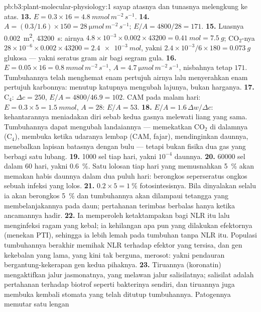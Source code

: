 \begin{solution}{pb:b3:plant-molecular-physiology:1}
sayap atasnya dan tunasnya melengkung ke atas.
\textbf{13.} $E = 0.3\times 16 = \qty{4.8}{mmol\,m^{-2}\,s^{-1}}$.
\textbf{14.} $A = (0.3/1.6)\times 150 = \qty{28}{\micro mol\,m^{-2}\,s^{-1}}$;
$E/A = 4800/28 = 171$.
\textbf{15.} Luasnya \qty{0.002}{m^2}, \num{43200}~s: airnya $4.8\times
10^{-3}\times 0.002\times\num{43200} = \qty{0.41}{mol} = \qty{7.5}{g}$;
CO$_{2}$-nya $28\times 10^{-6}\times 0.002\times\num{43200} =
\qty{2.4e-3}{mol}$, yakni $2.4\times 10^{-3}/6\times 180 =
\qty{0.073}{g}$ glukosa --- yakni seratus gram air bagi segram
gula.
\textbf{16.} $E = 0.05\times 16 = \qty{0.8}{mmol\,m^{-2}\,s^{-1}}$,
$A = \qty{4.7}{\micro mol\,m^{-2}\,s^{-1}}$, nisbahnya tetap $171$. Tumbuhannya
telah menghemat enam pertujuh airnya lalu menyerahkan enam pertujuh
karbonnya: menutup katupnya mengubah lajunya, bukan harganya.
\textbf{17.} C$_{4}$: $\Delta c = 250$, $E/A = 4800/46.9 = 102$. CAM pada
malam hari: $E = 0.3\times 5 = \qty{1.5}{mmol}$, $A = 28$: $E/A = 53$.
\textbf{18.} $E/A = 1.6\,\Delta w/\Delta c$: kehantarannya meniadakan diri
sebab kedua gasnya melewati liang yang sama. Tumbuhannya dapat mengubah
landaiannya --- memekatkan CO$_{2}$ di dalamnya (C$_{4}$), membuka ketika udaranya
lembap (CAM, fajar), mendinginkan daunnya, menebalkan lapisan batasnya dengan bulu
--- tetapi bukan fisika dua gas yang berbagi satu lubang.
\textbf{19.} \num{1000} sel tiap hari, yakni $10^{-4}$ daunnya.
\textbf{20.} \num{60000} sel dalam 60 hari, yakni \qty{0.6}{\%}. Satu lolosan tiap
hari yang memusnahkan \qty{5}{\%} akan memakan habis daunnya dalam dua puluh hari:
 berongkos seperseratus ongkos sebuah infeksi
yang lolos.
\textbf{21.} $0.2\times 5 = \qty{1}{\%}$ fotosintesisnya. Bila dinyalakan
selalu ia akan berongkos \qty{5}{\%} dan tumbuhannya akan dilampaui
tetangga yang membelanjakannya pada daun; pertahanan terimbas berbalas hanya ketika
ancamannya hadir.
\textbf{22.} Ia memperoleh ketaktampakan bagi NLR itu lalu menginfeksi ragam yang
kebal; ia kehilangan apa pun yang dilakukan efektornya (menekan PTI), sehingga ia
lebih lemah pada tumbuhan tanpa NLR itu. Populasi tumbuhannya berakhir
memihak NLR terhadap efektor yang tersisa, dan gen kekebalan yang lama,
yang kini tak berguna, merosot: yakni pendauran bergantung-kekerapan gen kedua
pihaknya.
\textbf{23.} Tiruannya (koronatin) mengaktifkan jalur jasmonatnya,
yang melawan jalur salisilatnya; salisilat adalah pertahanan
terhadap biotrof seperti bakterinya sendiri, dan tiruannya juga
membuka kembali stomata yang telah ditutup tumbuhannya. Patogennya memutar satu lengan

\end{solution}
